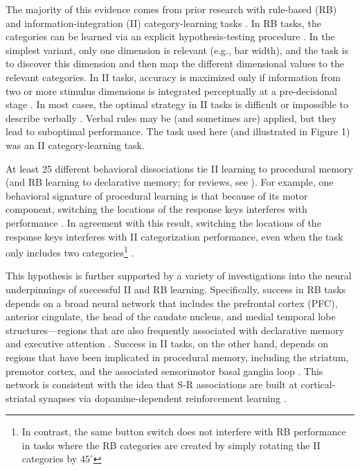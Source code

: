 \documentclass[man,apacite,draftfirst]{apa6} \usepackage{amsmath}
\begin{document}
The majority of this evidence comes from prior research with rule-based (RB) and
information-integration (II) category-learning tasks \cite{HelieRoederAshby2010,
NomuraEtAl2007, SotoEtAl2013, WaldschmidtAshby2011}. In RB tasks, the categories
can be learned via an explicit hypothesis-testing procedure
\cite{AshbyCOVIS1998}. In the simplest variant, only one dimension is relevant
(e.g., bar width), and the task is to discover this dimension and then map the
different dimensional values to the relevant categories. In II tasks, accuracy
is maximized only if information from two or more stimulus dimensions is
integrated perceptually at a pre-decisional stage \cite{AshbyGott1988}. In most
cases, the optimal strategy in II tasks is difficult or impossible to describe
verbally \cite{AshbyCOVIS1998}. Verbal rules may be (and sometimes are) applied,
but they lead to suboptimal performance. The task used here (and illustrated in
Figure 1) was an II category-learning task.

At least 25 different behavioral dissociations tie II learning to procedural
memory (and RB learning to declarative memory; for reviews, see
). For example, one
behavioral signature of procedural learning is that because of its motor
component, switching the locations of the response keys interferes with
performance \cite{WillinghamButtonSwitch2000}. In agreement with this result,
switching the locations of the response keys interferes with II categorization
performance, even when the task only includes two categories\footnote{In
contrast, the same button switch does not interfere with RB performance in tasks
where the RB categories are created by simply rotating the II categories by
$45^\circ$} \cite{AshbyEllWaldron2003, MaddoxBohilIng2004, SpieringAshby2008}.

This hypothesis is further supported by a variety of investigations into the
neural underpinnings of successful II and RB learning. Specifically, success in
RB tasks depends on a broad neural network that includes the prefrontal cortex
(PFC), anterior cingulate, the head of the caudate nucleus, and medial temporal
lobe structures---regions that are also frequently associated with declarative
memory and executive attention \cite{BrownMarsden1988, FiloteoEtAl2007,
MuhammadWallisMiller2006, SegerCincotta2006}. Success in II tasks, on the other
hand, depends on regions that have been implicated in procedural memory,
including the striatum, premotor cortex, and the associated sensorimotor basal
ganglia loop \cite{AshbyEnnis2006, FiloteoMaddoxSalmonSong2005,
KnowltonMangelsSquire1996, NomuraEtAl2007}. This network is consistent with the
idea that S-R associations are built at cortical-striatal synapses via
dopamine-dependent reinforcement learning \cite{AshbyCrossley2011,
HoukAdamsBarto1995, joel_actorcritic_2002}.
\end{document}
